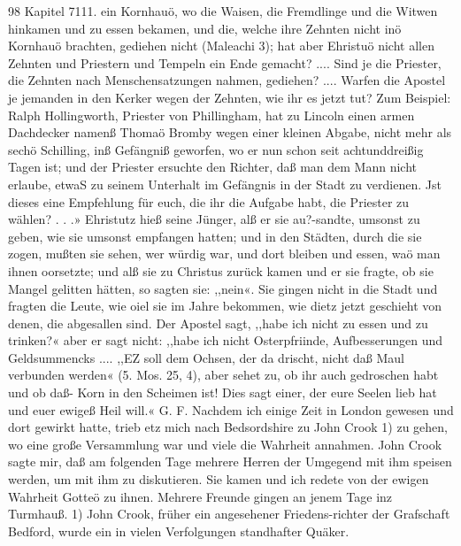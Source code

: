 98 Kapitel 7111.
ein Kornhauö, wo die Waisen, die Fremdlinge und die Witwen
hinkamen und zu essen bekamen, und die, welche ihre Zehnten
nicht inö Kornhauö brachten, gediehen nicht (Maleachi 3); hat
aber Ehristuö nicht allen Zehnten und Priestern und Tempeln
ein Ende gemacht? .... Sind je die Priester, die Zehnten nach
Menschensatzungen nahmen, gediehen? .... Warfen die Apostel
je jemanden in den Kerker wegen der Zehnten, wie ihr es jetzt tut?
Zum Beispiel: Ralph Hollingworth, Priester von Phillingham,
hat zu Lincoln einen armen Dachdecker namenß Thomaö Bromby
wegen einer kleinen Abgabe, nicht mehr als sechö Schilling, inß
Gefängniß geworfen, wo er nun schon seit achtunddreißig Tagen
ist; und der Priester ersuchte den Richter, daß man dem Mann
nicht erlaube, etwaS zu seinem Unterhalt im Gefängnis in der
Stadt zu verdienen. Jst dieses eine Empfehlung für euch, die ihr
die Aufgabe habt, die Priester zu wählen? . . .» Ehristutz hieß
seine Jünger, alß er sie au?-sandte, umsonst zu geben, wie sie
umsonst empfangen hatten; und in den Städten, durch die sie
zogen, mußten sie sehen, wer würdig war, und dort bleiben und
essen, waö man ihnen oorsetzte; und alß sie zu Christus zurück
kamen und er sie fragte, ob sie Mangel gelitten hätten, so sagten
sie: ,,nein«. Sie gingen nicht in die Stadt und fragten die
Leute, wie oiel sie im Jahre bekommen, wie dietz jetzt geschieht
von denen, die abgesallen sind. Der Apostel sagt, ,,habe ich
nicht zu essen und zu trinken?« aber er sagt nicht: ,,habe ich nicht
Osterpfriinde, Aufbesserungen und Geldsummencks .... ,,EZ soll
dem Ochsen, der da drischt, nicht daß Maul verbunden werden«
(5. Mos. 25, 4), aber sehet zu, ob ihr auch gedroschen habt und
ob daß- Korn in den Scheimen ist! Dies sagt einer, der eure
Seelen lieb hat und euer ewigeß Heil will.« G. F.
Nachdem ich einige Zeit in London gewesen und dort gewirkt
hatte, trieb etz mich nach Bedsordshire zu John Crook 1) zu gehen,
wo eine große Versammlung war und viele die Wahrheit annahmen.
John Crook sagte mir, daß am folgenden Tage mehrere Herren
der Umgegend mit ihm speisen werden, um mit ihm zu diskutieren.
Sie kamen und ich redete von der ewigen Wahrheit Gotteö zu
ihnen. Mehrere Freunde gingen an jenem Tage inz Turmhauß.
1) John Crook, früher ein angesehener Friedens-richter der Grafschaft
Bedford, wurde ein in vielen Verfolgungen standhafter Quäker.



